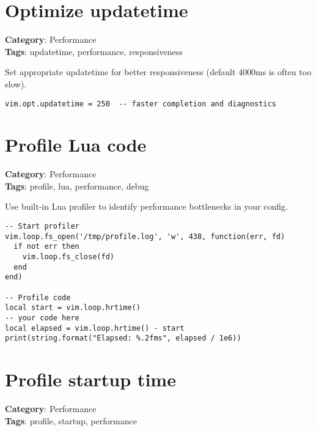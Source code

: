 {{{{{{{{{{\section{Optimize updatetime}

\textbf{Category}: Performance\\ \textbf{Tags}: updatetime, performance, responsiveness
\vspace{0.5cm}

Set appropriate updatetime for better responsiveness (default 4000ms is often too slow).

\begin{Exa*}{}
\begin{Verbatim}[fontsize=\footnotesize, breaklines, breakanywhere]
vim.opt.updatetime = 250  -- faster completion and diagnostics
\end{Verbatim}
\end{Exa*}

\section{Profile Lua code}

\textbf{Category}: Performance\\ \textbf{Tags}: profile, lua, performance, debug
\vspace{0.5cm}

Use built-in Lua profiler to identify performance bottlenecks in your config.

\begin{Exa*}{}
\begin{Verbatim}[fontsize=\footnotesize, breaklines, breakanywhere]
-- Start profiler
vim.loop.fs_open('/tmp/profile.log', 'w', 438, function(err, fd)
  if not err then
    vim.loop.fs_close(fd)
  end
end)

-- Profile code
local start = vim.loop.hrtime()
-- your code here
local elapsed = vim.loop.hrtime() - start
print(string.format("Elapsed: %.2fms", elapsed / 1e6))
\end{Verbatim}
\end{Exa*}

\section{Profile startup time}

\textbf{Category}: Performance\\ \textbf{Tags}: profile, startup, performance
\vspace{0.5cm}

}}}}}}}}}}
